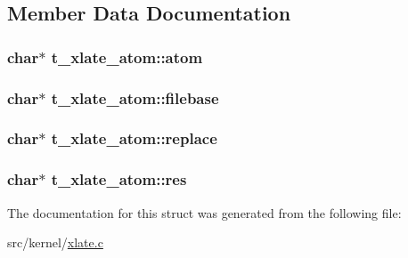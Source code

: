 \subsection{\-Member \-Data \-Documentation}
\hypertarget{structt__xlate__atom_ab00c2b1487a1af963570d9c6fd1472f7}{
\subsubsection[{atom}]{\setlength{\rightskip}{0pt plus 5cm}char$\ast$ {\bf t\-\_\-xlate\-\_\-atom\-::atom}}}\label{structt__xlate__atom_ab00c2b1487a1af963570d9c6fd1472f7}
\hypertarget{structt__xlate__atom_a49e115b80cf09d3efa18cae77de0306c}{
\subsubsection[{filebase}]{\setlength{\rightskip}{0pt plus 5cm}char$\ast$ {\bf t\-\_\-xlate\-\_\-atom\-::filebase}}}\label{structt__xlate__atom_a49e115b80cf09d3efa18cae77de0306c}
\hypertarget{structt__xlate__atom_afd321d8ee8e29587b3847544f224bce1}{
\subsubsection[{replace}]{\setlength{\rightskip}{0pt plus 5cm}char$\ast$ {\bf t\-\_\-xlate\-\_\-atom\-::replace}}}\label{structt__xlate__atom_afd321d8ee8e29587b3847544f224bce1}
\hypertarget{structt__xlate__atom_ab62cb66a5ddcdd9c553829070957141c}{
\subsubsection[{res}]{\setlength{\rightskip}{0pt plus 5cm}char$\ast$ {\bf t\-\_\-xlate\-\_\-atom\-::res}}}\label{structt__xlate__atom_ab62cb66a5ddcdd9c553829070957141c}


\-The documentation for this struct was generated from the following file\-:\begin{DoxyCompactItemize}
\item 
src/kernel/\hyperlink{xlate_8c}{xlate.\-c}\end{DoxyCompactItemize}

